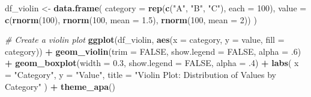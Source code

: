 \documentclass[
]{book}
\newenvironment{Shaded}{\begin{snugshade}}{\end{snugshade}}
\newcommand{\AttributeTok}[1]{\textcolor[rgb]{0.13,0.29,0.53}{#1}}
\newcommand{\CommentTok}[1]{\textcolor[rgb]{0.56,0.35,0.01}{\textit{#1}}}
\newcommand{\ConstantTok}[1]{\textcolor[rgb]{0.56,0.35,0.01}{#1}}
\newcommand{\DecValTok}[1]{\textcolor[rgb]{0.00,0.00,0.81}{#1}}
\newcommand{\FloatTok}[1]{\textcolor[rgb]{0.00,0.00,0.81}{#1}}
\newcommand{\FunctionTok}[1]{\textcolor[rgb]{0.13,0.29,0.53}{\textbf{#1}}}
\newcommand{\NormalTok}[1]{#1}
\newcommand{\OtherTok}[1]{\textcolor[rgb]{0.56,0.35,0.01}{#1}}
\newcommand{\SpecialCharTok}[1]{\textcolor[rgb]{0.81,0.36,0.00}{\textbf{#1}}}
\newcommand{\StringTok}[1]{\textcolor[rgb]{0.31,0.60,0.02}{#1}}
\begin{document}
\begin{Shaded}
\begin{Highlighting}[]
\NormalTok{df\_violin }\OtherTok{\textless{}{-}} \FunctionTok{data.frame}\NormalTok{(}
  \AttributeTok{category =} \FunctionTok{rep}\NormalTok{(}\FunctionTok{c}\NormalTok{(}\StringTok{"A"}\NormalTok{, }\StringTok{"B"}\NormalTok{, }\StringTok{"C"}\NormalTok{), }\AttributeTok{each =} \DecValTok{100}\NormalTok{),}
  \AttributeTok{value =} \FunctionTok{c}\NormalTok{(}\FunctionTok{rnorm}\NormalTok{(}\DecValTok{100}\NormalTok{), }\FunctionTok{rnorm}\NormalTok{(}\DecValTok{100}\NormalTok{, }\AttributeTok{mean =} \FloatTok{1.5}\NormalTok{), }\FunctionTok{rnorm}\NormalTok{(}\DecValTok{100}\NormalTok{, }\AttributeTok{mean =} \DecValTok{2}\NormalTok{))}
\NormalTok{)}

\CommentTok{\# Create a violin plot}
\FunctionTok{ggplot}\NormalTok{(df\_violin, }\FunctionTok{aes}\NormalTok{(}\AttributeTok{x =}\NormalTok{ category, }\AttributeTok{y =}\NormalTok{ value, }\AttributeTok{fill =}\NormalTok{ category)) }\SpecialCharTok{+}
  \FunctionTok{geom\_violin}\NormalTok{(}\AttributeTok{trim =} \ConstantTok{FALSE}\NormalTok{, }
              \AttributeTok{show.legend =} \ConstantTok{FALSE}\NormalTok{, }
              \AttributeTok{alpha =}\NormalTok{ .}\DecValTok{6}\NormalTok{) }\SpecialCharTok{+}
  \FunctionTok{geom\_boxplot}\NormalTok{(}\AttributeTok{width =} \FloatTok{0.3}\NormalTok{, }
               \AttributeTok{show.legend =} \ConstantTok{FALSE}\NormalTok{,}
               \AttributeTok{alpha =}\NormalTok{ .}\DecValTok{4}\NormalTok{) }\SpecialCharTok{+}
  \FunctionTok{labs}\NormalTok{(}
    \AttributeTok{x =} \StringTok{"Category"}\NormalTok{,}
    \AttributeTok{y =} \StringTok{"Value"}\NormalTok{,}
    \AttributeTok{title =} \StringTok{"Violin Plot: Distribution of Values by Category"}
\NormalTok{  ) }\SpecialCharTok{+}
  \FunctionTok{theme\_apa}\NormalTok{()}
\end{Highlighting}
\end{Shaded}
\end{document}
